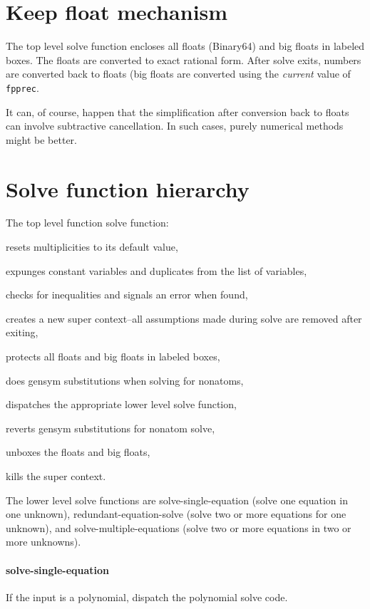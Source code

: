 \documentclass[]{article}%
\newcommand{\fpprec}{\texttt{fpprec}}
\begin{document}
\section{Keep float mechanism}

The top level solve function encloses all floats (Binary64) and big floats in labeled boxes. The floats are converted to exact rational form.
After solve exits, numbers are converted back to floats (big floats are converted using the \emph{current} value of \fpprec.

It can, of course, happen that the simplification after conversion back to floats can involve subtractive cancellation. In such cases, purely numerical methods might be better.

\section{Solve function hierarchy}

 The top level function solve function:
 \begin{alphalist}[noitemsep]
   \item resets multiplicities to its default value,
   \item expunges constant variables and duplicates from the list of variables,
   \item checks for inequalities and signals an error when found,
   \item creates a new super context--all assumptions made during solve are removed after exiting,
   \item protects all floats and big floats in labeled boxes,
   \item does gensym substitutions when solving for nonatoms,
   \item dispatches the appropriate lower level solve function,
   \item reverts gensym substitutions for nonatom solve,
   \item unboxes the floats and big floats,
   \item kills the super context.
\end{alphalist}

The lower level solve functions are solve-single-equation (solve one equation in one unknown), redundant-equation-solve (solve two or more equations for one unknown), and solve-multiple-equations (solve two or more equations in two or more unknowns).

\paragraph{solve-single-equation} If the input is a polynomial, dispatch the polynomial solve code.
\end{document}
